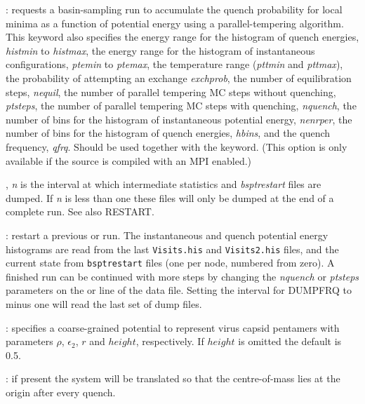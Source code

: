 : 
requests a basin-sampling run to accumulate the quench probability for local minima 
as a function of potential energy using 
a parallel-tempering algorithm. 
This keyword also specifies the energy range for the histogram of quench energies,
{\it histmin\/} to {\it histmax\/},
the energy range for the histogram of instantaneous configurations, {\it ptemin} to {\it ptemax}, 
the temperature range ({\it pttmin} and {\it pttmax}), 
the probability of attempting an exchange {\it exchprob}, the 
number of equilibration steps, {\it nequil},
the number of parallel tempering MC steps without quenching,  {\it ptsteps},
the number of parallel tempering MC steps with quenching,  {\it nquench},
the number of bins for the histogram of instantaneous potential energy, {\it nenrper},
the number of bins for the histogram of quench energies, {\it hbins},  
and the quench frequency, {\it qfrq}.  
Should be used together with the {\/} keyword. %
(This option is only available if the source is compiled with an MPI enabled.)  

, {\it n\/} is the interval at which intermediate statistics
and {\it bsptrestart\/} files are dumped. If {\it n\/} is less than one these files
will only be dumped at the end of a complete run. 
See also {RESTART\/}.

: restart a previous {\/} or {\/} run.
The instantaneous and quench potential energy histograms are read from the last
{\tt Visits.his} and {\tt Visits2.his} files, and the current state from 
{\tt bsptrestart} files (one per node, numbered from zero).
A finished run can be continued with more steps by changing the {\it nquench} 
or {\it ptsteps} parameters on the {\/} or {\/} line of
the data file. Setting the interval for {DUMPFRQ} to
minus one will read the last set of dump files.


: specifies a coarse-grained potential to represent virus capsid pentamers
with parameters $\rho$, $\epsilon_2$, $r$ and $height$, respectively.
If $height$ is omitted the default is 0.5.

: if present the system will be translated so that the centre-of-mass 
lies at the origin after every quench.

